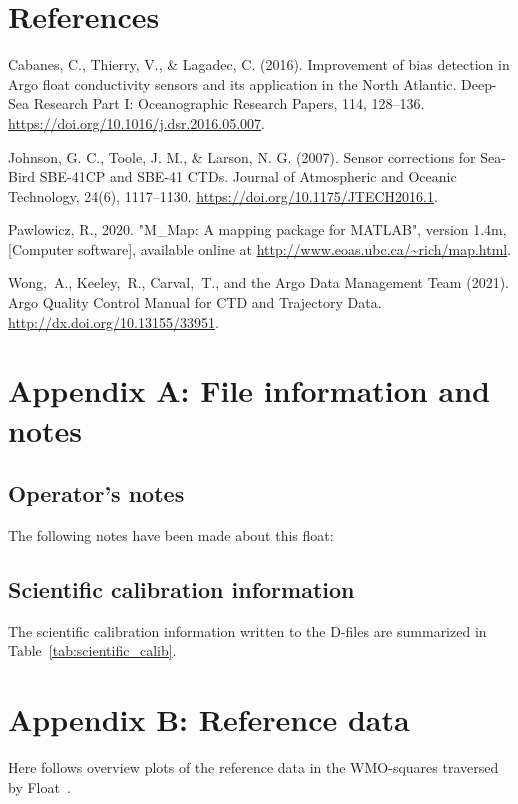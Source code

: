 \documentclass{article}
\begin{document}
\section*{References}
\begin{list}{}{}
\item Cabanes, C., Thierry, V., \& Lagadec, C. (2016). Improvement of bias
  detection in Argo float conductivity sensors and its application in the
  North Atlantic. Deep-Sea Research Part I: Oceanographic Research Papers,
  114, 128–136. \href{url}{https://doi.org/10.1016/j.dsr.2016.05.007}.
\item Johnson, G. C., Toole, J. M., \& Larson, N. G. (2007). Sensor
  corrections for Sea-Bird SBE-41CP and SBE-41 CTDs. Journal of
  Atmospheric and Oceanic Technology, 24(6), 1117–1130.
  \href{url}{https://doi.org/10.1175/JTECH2016.1}.
\item Pawlowicz, R., 2020. "M\_Map: A mapping package for MATLAB", version
  1.4m, [Computer software], available online at
  \url{http://www.eoas.ubc.ca/~rich/map.html}.
\item Wong,~A., Keeley,~R., Carval,~T., and the Argo Data Management Team
  (2021).  Argo Quality Control Manual for CTD and Trajectory Data.
  \href{url}{http://dx.doi.org/10.13155/33951}.
\end{list}



\newpage
\section{Appendix A: File information and notes}\label{sec:appendix-notes}
%
\subsection*{Operator's notes}
The following notes have been made about this float:


\subsection*{Scientific calibration information}
The scientific calibration information written to the D-files are
summarized in Table~\ref{tab:scientific_calib}.
%


\FloatBarrier
\section{Appendix B: Reference data}\label{sec:appendix-refdata}
Here follows overview plots of the reference data in the WMO-squares
traversed by Float~\WMOnum.


\end{document}
